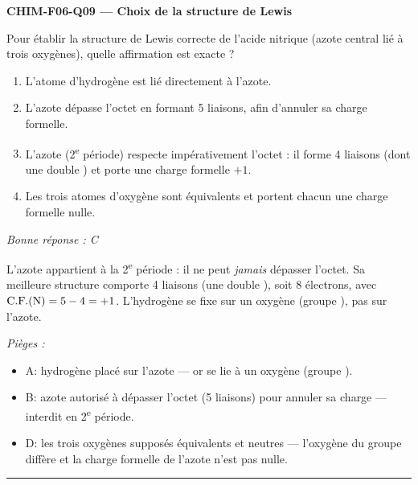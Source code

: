 \documentclass[11pt,a4paper]{article}
\begin{document}
\noindent\textbf{CHIM-F06-Q09 --- Choix de la structure de Lewis}\par
Pour établir la structure de Lewis correcte de l'acide nitrique  (azote central lié à trois
oxygènes), quelle affirmation est exacte ?
\begin{enumerate}[label=\Alph*)]
\item L'atome d'hydrogène est lié directement à l'azote.
\item L'azote dépasse l'octet en formant 5 liaisons, afin d'annuler sa charge formelle.
\item L'azote (2\textsuperscript{e} période) respecte impérativement l'octet : il forme 4 liaisons (dont une double ) et porte une charge formelle $+1$.
\item Les trois atomes d'oxygène sont équivalents et portent chacun une charge formelle nulle.
\end{enumerate}
\textit{Bonne réponse : C}\par
L'azote appartient à la 2\textsuperscript{e} période : il ne peut \emph{jamais} dépasser l'octet. Sa
meilleure structure comporte 4 liaisons (une double ), soit 8 électrons, avec
$\mathrm{C.F.}(\ce{N})=5-4=+1$. L'hydrogène se fixe sur un oxygène (groupe ), pas sur
l'azote.\par
\textit{Pièges :}
\begin{itemize}
\item A: hydrogène placé sur l'azote --- or  se lie à un oxygène (groupe ).
\item B: azote autorisé à dépasser l'octet (5 liaisons) pour annuler sa charge --- interdit en 2\textsuperscript{e} période.
\item D: les trois oxygènes supposés équivalents et neutres --- l'oxygène du groupe  diffère et la charge formelle de l'azote n'est pas nulle.
\end{itemize}
\vspace{8pt}\hrule\vspace{8pt}
\end{document}
